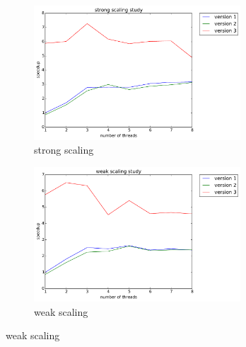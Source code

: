 \documentclass[12pt]{article}
\numberwithin{equation}{section}
\begin{document}
\begin{figure}[!ht]
   \begin{subfigure}
      \centering
        \begin{center}
      \includegraphics[width=0.85\textwidth] {plots/2_for_strong}
        \end{center}
      \label{aload0}
      \caption{strong scaling}
  \end{subfigure}
  \begin{subfigure}
      \centering
        \begin{center}
      \includegraphics[width=0.85\textwidth] {plots/2_for_weak}
        \end{center}
      \label{aload1}
      \caption{weak scaling}
  \end{subfigure}

\end{figure}
\end{document}
